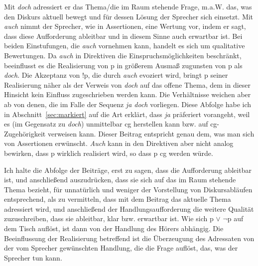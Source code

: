 Mit \textit{doch} adressiert er das Thema/die im Raum stehende Frage, m.a.W. das, was den Diskurs aktuell bewegt und für dessen Lösung der Sprecher sich einsetzt. Mit \textit{auch} nimmt der Sprecher, wie in Assertionen, eine Wertung vor, indem er sagt, dass diese Aufforderung ableitbar und in diesem Sinne auch erwartbar ist. Bei beiden Einstufungen, die \textit{auch} vornehmen kann, handelt es sich um qualitative Bewertungen. Da \textit{auch} in Direktiven die Einspruchsmöglichkeiten beschränkt, beeinflusst es die Realisierung von p in größerem Ausmaß zugunsten von p als \textit{doch}. Die Akzeptanz von !p, die durch \textit{auch} evoziert wird, bringt p seiner Rea\-lisierung näher als der Verweis von \textit{doch} auf das offene Thema, dem in dieser Hinsicht kein Einfluss zugeschrieben werden kann. Die Verhältnisse weichen aber ab von denen, die im Falle der Sequenz \textit{ja doch} vorliegen. Diese Abfolge habe ich in Abschnitt~\ref{sec:markiert} auf die Art erklärt, dass \textit{ja} präferiert vorangeht, weil es (im Gegensatz zu \textit{doch}) unmittelbar cg herstellen kann bzw. auf cg-Zugehörigkeit verweisen kann. Dieser Beitrag entspricht genau dem, was man sich von Assertionen erwünscht. \textit{Auch} kann in den Direktiven aber nicht analog bewirken, dass p wirklich realisiert wird, so dass p cg werden würde.

Ich halte die Abfolge der Beiträge, erst zu sagen, dass die Aufforderung ableitbar ist, und anschließend auszudrücken, dass sie sich auf das im Raum stehende Thema bezieht, für unnatürlich und weniger der Vorstellung von Diskursabläufen entsprechend, als zu vermitteln, dass mit dem Beitrag das aktuelle Thema adressiert wird, und anschließend der Handlungsaufforderung die weitere Qualität zuzu\-schreiben, dass sie ableitbar, klar bzw. erwartbar ist. Wie sich p $\vee$ $\neg$p auf dem Tisch auflöst, ist dann von der Handlung des Hörers abhängig. Die Beeinflussung der Realisierung betreffend ist die Überzeugung des Adressaten von der vom Sprecher gewünschten Handlung, die die Frage auflöst, das, was der Sprecher tun kann. 

